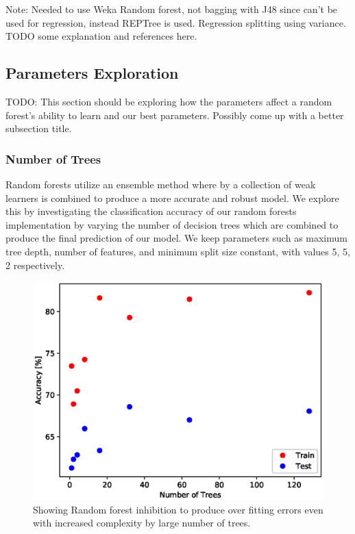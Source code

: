\documentclass{article} %
\begin{document}
Note: Needed to use Weka Random forest, not bagging with J48 since can't be used for regression, instead REPTree is used.
Regression splitting using variance. TODO some explanation and references here.

\subsection{Parameters Exploration}
TODO: This section should be exploring how the parameters affect a random forest's ability to learn and our best parameters.  Possibly come up with a better subsection title.

\subsubsection{Number of Trees}

Random forests utilize an ensemble method where by a collection of weak learners is combined to produce a more accurate and robust model. We explore this by investigating the classification accuracy of our random forests implementation by varying the number of decision trees which are combined to produce the final prediction of our model. We keep parameters such as maximum tree depth, number of features, and minimum split size constant, with values 5, 5, 2 respectively. 

\begin{figure}[ht]
\begin{center}
\includegraphics[scale=0.4]{n_trees}
\end{center}
\caption{Showing Random forest inhibition to produce over fitting errors even with increased complexity by large number of trees.}
\label{fig:n_trees}
\end{figure}
\end{document}
